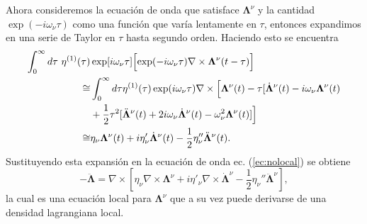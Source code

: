 Ahora consideremos la ecuaci\'{o}n de onda que satisface $\mathbf{\Lambda}^{\nu}$ y la cantidad $\exp(-i\omega_{\nu}\tau)$ como una funci\'{o}n que var\'{i}a lentamente en $\tau$, entonces expandimos en una serie de Taylor en $\tau $ hasta segundo orden. Haciendo esto se encuentra
\begin{align}
\nonumber \int_0^{\infty} d\tau \ \eta^{(1)}(\tau)&\exp[i\omega_{\nu}\tau]\Bigl[\exp(-i\omega_{\nu}\tau)\nabla\times \mathbf{\Lambda}^{\nu}(t-\tau)\Bigr]\\
\nonumber \cong & \int_0^{\infty} d \tau \eta^{(1)}(\tau)\exp(i\omega_{\nu}\tau)\nabla \times \Bigl[\mathbf{\Lambda}^{\nu}(t)-\tau[\dot{\mathbf{\Lambda}}^{\nu}(t)-i\omega_{\nu}{\mathbf{\Lambda}}^{\nu}(t)\\
\nonumber &+\frac{1}{2}\tau^2[\ddot{\mathbf{\Lambda}}^{\nu}(t)+2i\omega_{\nu}\dot{\mathbf{\Lambda}}^{\nu}(t)-\omega_{\nu}^2\mathbf{\Lambda}^{\nu}(t)]\Bigr]\\
\cong & \eta_{\nu}\mathbf{\Lambda}^{\nu}(t)+i \eta_{\nu}'\dot{\mathbf{\Lambda}}^{\nu}(t)-\frac{1}{2}\eta_{\nu}''\ddot{\mathbf{\Lambda}}^{\nu}(t).
\end{align}
Sustituyendo esta expansi\'{o}n en la ecuaci\'{o}n de onda ec. (\ref{ec:nolocal}) se obtiene
\begin{equation}
-\ddot{\mathbf{\Lambda}}=\nabla\times[\eta_{\nu}\nabla\times\mathbf{\Lambda}^{\nu}+i\eta'_{\nu}\nabla \times \dot{\mathbf{\Lambda}}^{\nu}-\frac{1}{2}\eta_{\nu}''\ddot{\mathbf{\Lambda}}^{\nu}],
\end{equation}
la cual es una ecuaci\'{o}n local para $\mathbf{\Lambda}^{\nu}$ que a su vez puede derivarse de una densidad lagrangiana local.

